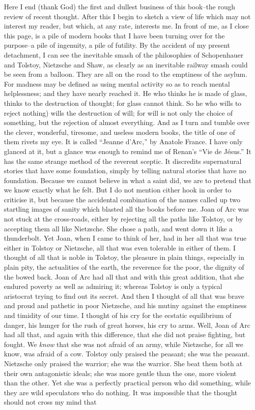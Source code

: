 \documentclass{book}
\begin{document}
Here I end (thank God) the first and dullest business of this book–the rough review of recent thought. After this I begin to sketch a view of life which may not interest my reader, but which, at any rate, interests me. In front of me, as I close this page, is a pile of modern books that I have been turning over for the purpose–a pile of ingenuity, a pile of futility. By the accident of my present detachment, I can see the inevitable smash of the philosophies of Schopenhauer and Tolstoy, Nietzsche and Shaw, as clearly as an inevitable railway smash could be seen from a balloon. They are all on the road to the emptiness of the asylum. For madness may be defined as using mental activity so as to reach mental helplessness; and they have nearly reached it. He who thinks he is made of glass, thinks to the destruction of thought; for glass cannot think. So he who wills to reject nothing) wills the destruction of will; for will is not only the choice of something, but the rejection of almost everything. And as I turn and tumble over the clever, wonderful, tiresome, and useless modern books, the title of one of them rivets my eye. It is called “Jeanne d’Arc,” by Anatole France. I have only glanced at it, but a glance was enough to remind me of Renan’s “Vie de Jésus.” It has the same strange method of the reverent sceptic. It discredits supernatural stories that have some foundation, simply by telling natural stories that have no foundation. Because we cannot believe in what a saint did, we are to pretend that we know exactly what he felt. But I do not mention cither hook in order to criticise it, but because the accidental combination of the names called up two startling images of sanity which blasted all the books before me. Joan of Arc was not stuck at the cross-roads, either by rejecting all the paths like Tolstoy, or by accepting them all like Nietzsche. She chose a path, and went down it like a thunderbolt. Yet Joan, when I came to think of her, had in her all that was true either in Tolstoy or Nietzsche, all that was even tolerable in either of them. I thought of all that is noble in Tolstoy, the pleasure in plain things, especially in plain pity, the actualities of the earth, the reverence for the poor, the dignity of the bowed back. Joan of Arc had all that and with this great addition, that she endured poverty as well as admiring it; whereas Tolstoy is only a typical aristocrat trying to find out its secret. And then I thought of all that was brave and proud and pathetic in poor Nietzsche, and his mutiny against the emptiness and timidity of our time. I thought of his cry for the ecstatic equilibrium of danger, his hunger for the rush of great horses, his cry to arms. Well, Joan of Arc had all that, and again with this difference, that she did not praise fighting, but fought. We \emph{know} that she was not afraid of an army, while Nietzsche, for all we know, was afraid of a cow. Tolstoy only praised the peasant; she was the peasant. Nietzsche only praised the warrior; she was the warrior. She beat them both at their own antagonistic ideals; she was more gentle than the one, more violent than the other. Yet she was a perfectly practical person who did something, while they are wild speculators who do nothing. It was impossible that the thought should not cross my mind that 
\end{document}
